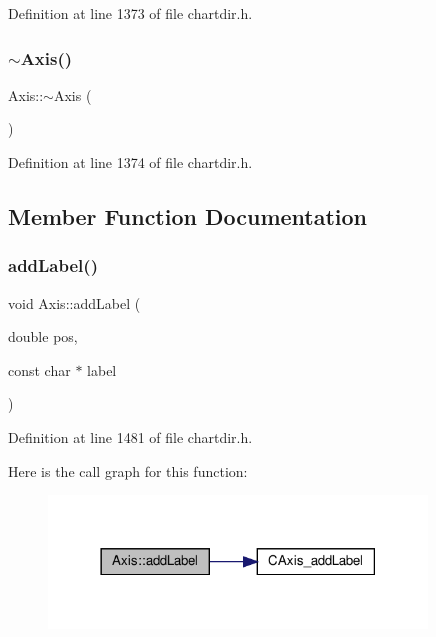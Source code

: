 Definition at line 1373 of file chartdir.\+h.

\mbox{\label{class_axis_a675ffe75a5e61a9e4f60bb79749d5e0c}} 
\subsubsection{\texorpdfstring{$\sim$\+Axis()}{~Axis()}}
{\footnotesize\ttfamily Axis\+::$\sim$\+Axis (\begin{DoxyParamCaption}{ }\end{DoxyParamCaption})\hspace{0.3cm}{\ttfamily [inline]}}



Definition at line 1374 of file chartdir.\+h.



\subsection{Member Function Documentation}
\mbox{\label{class_axis_ade3e74820cc853fdb4f577662ce78ae3}} 
\subsubsection{\texorpdfstring{add\+Label()}{addLabel()}}
{\footnotesize\ttfamily void Axis\+::add\+Label (\begin{DoxyParamCaption}\item[{double}]{pos,  }\item[{const char $\ast$}]{label }\end{DoxyParamCaption})\hspace{0.3cm}{\ttfamily [inline]}}



Definition at line 1481 of file chartdir.\+h.

Here is the call graph for this function\+:
\nopagebreak
\begin{figure}[H]
\begin{center}
\leavevmode
\includegraphics[width=285pt]{class_axis_ade3e74820cc853fdb4f577662ce78ae3_cgraph}
\end{center}
\end{figure}
\mbox{\label{class_axis_afd32537a0ccccbef0efea8c28a285530}} 
